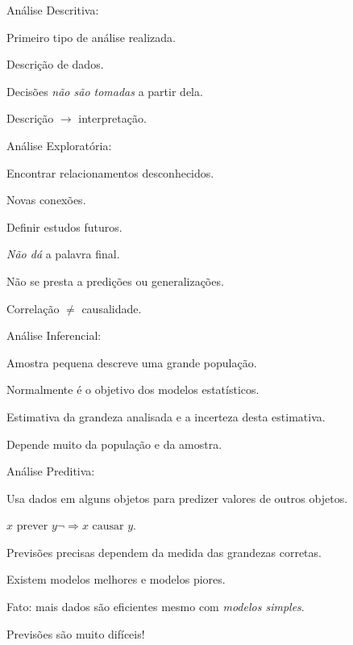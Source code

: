 \begin{multicols}{2}
\begin{nitemize}
\item Análise Descritiva:
  \begin{nitemize}
  \item Primeiro tipo de análise realizada.
  \item Descrição de dados.
  \item Decisões \emph{não são tomadas} a partir dela.
  \item Descrição $\to$ interpretação.
  \end{nitemize}
  
\item Análise Exploratória:
  \begin{nitemize}
  \item Encontrar relacionamentos desconhecidos.
  \item Novas conexões.
  \item Definir estudos futuros.
  \item \emph{Não dá} a palavra final.
  \item Não se presta a predições ou generalizações.
  \item Correlação $\neq$ causalidade.
  \end{nitemize}
  
\item Análise Inferencial:
  \begin{nitemize}
  \item Amostra pequena descreve uma grande população.
  \item Normalmente é o objetivo dos modelos estatísticos.
  \item Estimativa da grandeza analisada e a incerteza desta estimativa.
  \item Depende muito da população e da amostra.
  \end{nitemize}
  
\item Análise Preditiva:
  \begin{nitemize}
  \item Usa dados em alguns objetos para predizer valores de outros objetos.
  \item $x \mbox{ prever }y \neg\Rightarrow x \mbox{ causar }y$.
  \item Previsões precisas dependem da medida das grandezas corretas.
  \item Existem modelos melhores e modelos piores.
  \item Fato: mais dados são eficientes mesmo com \emph{modelos simples}.
  \item Previsões são muito difíceis!
  \end{nitemize}
  

\end{nitemize}
\end{multicols}
